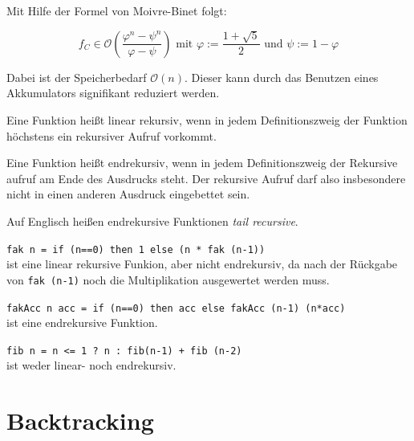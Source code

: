 Mit Hilfe der Formel von Moivre-Binet folgt:

\[f_C \in \mathcal{O} \left (\frac{\varphi^n- \psi^n}{\varphi - \psi} \right) \text{ mit } \varphi := \frac{1+ \sqrt{5}}{2} \text{ und }\psi := 1 - \varphi\]

Dabei ist der Speicherbedarf $\mathcal{O}(n)$. Dieser kann durch
das Benutzen eines Akkumulators signifikant reduziert werden.

\begin{definition}%
    Eine Funktion heißt linear rekursiv, wenn in jedem Definitionszweig
    der Funktion höchstens ein rekursiver Aufruf vorkommt.
\end{definition}

\begin{definition}%
    Eine Funktion heißt endrekursiv, wenn in jedem Definitionszweig
    der Rekursive aufruf am Ende des Ausdrucks steht. Der rekursive
    Aufruf darf also insbesondere nicht in einen anderen Ausdruck
    eingebettet sein.
\end{definition}

Auf Englisch heißen endrekursive Funktionen \textit{tail recursive}.

\begin{beispiel}
    \begin{bspenum}
        \item \texttt{fak n = if (n==0) then 1 else (n * fak (n-1))}\\
              ist eine linear rekursive Funkion, aber nicht endrekursiv,
              da nach der Rückgabe von \texttt{fak (n-1)} noch die Multiplikation
              ausgewertet werden muss.
        \item \texttt{fakAcc n acc = if (n==0) then acc else fakAcc (n-1) (n*acc)}\\
              ist eine endrekursive Funktion.
        \item \texttt{fib n = n <= 1 ? n : fib(n-1) + fib (n-2)}\\
              ist weder linear- noch endrekursiv.
    \end{bspenum}
\end{beispiel}

\section{Backtracking}

